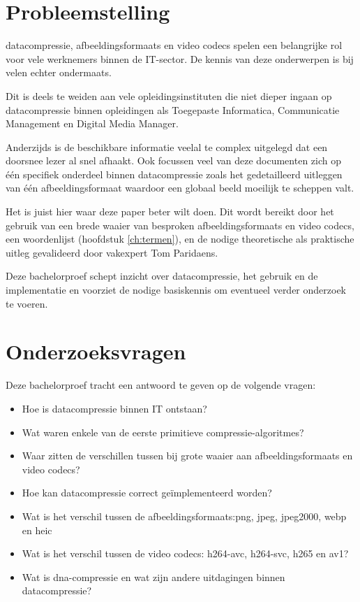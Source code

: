 \section{Probleemstelling}
\label{sec:probleemstelling}
\Gls{datacompressie}, \glspl{afbeeldingsformaat} en video \glspl{codec} spelen een belangrijke rol voor vele werknemers binnen de IT-sector. De kennis van deze onderwerpen is bij velen echter ondermaats. 

Dit is deels te weiden aan vele opleidingsinstituten die niet dieper ingaan op \gls{datacompressie} binnen opleidingen als Toegepaste Informatica, Communicatie Management en Digital Media Manager.

Anderzijds is de beschikbare informatie veelal te complex uitgelegd dat een doorsnee lezer al snel afhaakt. Ook focussen veel van deze documenten zich op één specifiek onderdeel binnen \gls{datacompressie} zoals het gedetailleerd uitleggen van één \gls{afbeeldingsformaat} waardoor een globaal beeld moeilijk te scheppen valt.

Het is juist hier waar deze paper beter wilt doen. Dit wordt bereikt door het gebruik van een brede waaier van besproken \glspl{afbeeldingsformaat} en video \glspl{codec}, een woordenlijst (hoofdstuk \ref{ch:termen}), en de nodige theoretische als praktische uitleg gevalideerd door vakexpert Tom Paridaens.

Deze bachelorproef schept inzicht over \gls{datacompressie}, het gebruik en de implementatie en voorziet de nodige basiskennis om eventueel verder onderzoek te voeren.

\section{Onderzoeksvragen}
\label{sec:onderzoeksvragen}
Deze bachelorproef tracht een antwoord te geven op de volgende vragen: 
\begin{itemize}
	\item Hoe is \gls{datacompressie} binnen IT ontstaan?
	\item Wat waren enkele van de eerste primitieve \glspl{compressie-algoritme}?
	\item Waar zitten de verschillen tussen bij grote waaier aan \glspl{afbeeldingsformaat} en video \glspl{codec}?
	\item Hoe kan \gls{datacompressie} correct geïmplementeerd worden?
	\item Wat is het verschil tussen de \glspl{afbeeldingsformaat}:\gls{png}, \gls{jpeg}, \gls{jpeg2000}, \gls{webp} en \gls{heic}
	\item Wat is het verschil tussen de video \glspl{codec}: \gls{h264-avc}, \gls{h264-svc}, \gls{h265} en \gls{av1}?
	\item Wat is \gls{dna-compressie} en wat zijn andere uitdagingen binnen \gls{datacompressie}?
\end{itemize}

